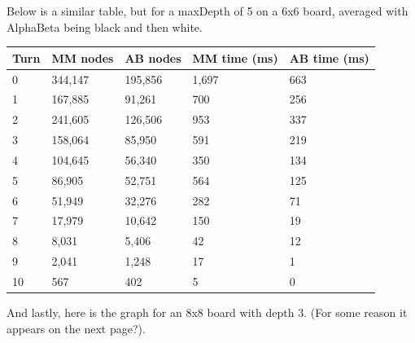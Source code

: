 \documentclass[12pt]{article}
\begin{document}
Below is a similar table, but for a maxDepth of 5 on a 6x6 board, averaged with AlphaBeta being black and then white. 

\begin{table}[h]
\begin{tabular}{|l|l|l|l|l|}
\hline
Turn & MM nodes & AB nodes & MM time (ms) & AB time (ms) \\ \hline
0    & 344,147   & 195,856   & 1,697         & 663          \\ \hline
1    & 167,885  & 91,261    & 700          & 256          \\ \hline
2    & 241,605   & 126,506   & 953          & 337          \\ \hline
3    & 158,064   & 85,950    & 591          & 219          \\ \hline
4    & 104,645  & 56,340   & 350          & 134          \\ \hline
5    & 86,905   & 52,751   & 564          & 125          \\ \hline
6    & 51,949   & 32,276   & 282          & 71           \\ \hline
7    & 17,979   & 10,642   & 150          & 19           \\ \hline
8    & 8,031     & 5,406     & 42           & 12           \\ \hline
9    & 2,041    & 1,248     & 17           & 1            \\ \hline
10   & 567      & 402      & 5            & 0            \\ \hline
\end{tabular}
\end{table}

And lastly, here is the graph for an 8x8 board with depth 3. (For some reason it appears on the next page?). 
\end{document}
